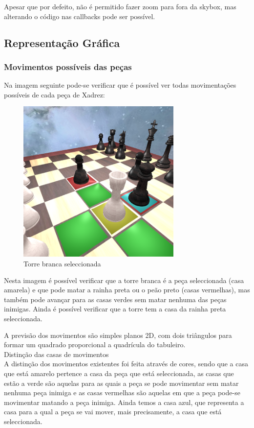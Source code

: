 \documentclass[portugues,final]{revdetua}
\begin{document}
Apesar que por defeito, não é permitido fazer zoom para fora da skybox, mas alterando o código nas callbacks pode ser possível.

\subsection{Representação Gráfica}

\subsubsection{Movimentos possíveis das peças}

Na imagem seguinte pode-se verificar que é possível ver todas movimentações possíveis de cada peça de Xadrez:

\begin{figure}[H]
\centerline{\includegraphics[width=230pt]{images/towerkill.png}}
\caption{Torre branca seleccionada}
\label{img:complete}
\end{figure}

Nesta imagem é possível verificar que a torre branca é a peça seleccionada (casa amarela) e que pode matar a rainha preta ou o peão preto (casas vermelhas), mas também pode avançar para as casas verdes sem matar nenhuma das peças inimigas. Ainda é possível verificar que a torre tem a casa da rainha preta seleccionada.

A previsão dos movimentos são simples planos 2D, com dois triângulos para formar um quadrado proporcional a quadrícula do tabuleiro.\\

{\large Distinção das casas de movimentos}\\

A distinção dos movimentos existentes foi feita através de cores, sendo que a casa que está amarelo pertence a casa da peça que está seleccionada, as casas que estão a verde são aquelas para as quais a peça se pode movimentar sem matar nenhuma peça inimiga e as casas vermelhas são aquelas em que a peça pode-se movimentar matando a peça inimiga. Ainda temos a casa azul, que representa a casa para a qual a peça se vai mover, mais precisamente, a casa que está seleccionada.
\end{document}
